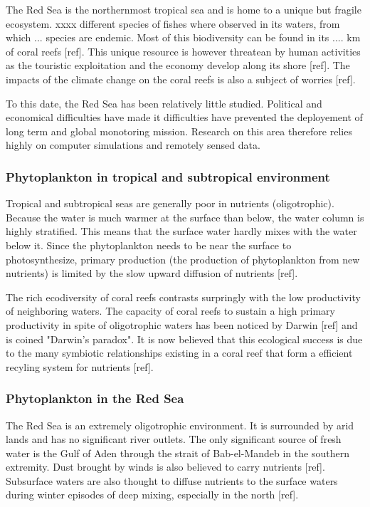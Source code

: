 			The Red Sea is the northernmost tropical sea and is home to a unique but fragile ecosystem. xxxx different species of fishes where observed in its waters, from which ... species are endemic. Most of this biodiversity can be found in its .... km  of coral reefs [ref]. This unique resource is however threatean by human activities as the touristic exploitation and the economy develop along its shore [ref]. The impacts of the climate change on the coral reefs is also a subject of worries [ref]. 

			To this date, the Red Sea has been relatively little studied. Political and economical difficulties have made it difficulties have prevented the deployement of long term and global monotoring mission. Research on this area therefore relies highly on computer simulations and remotely sensed data.

		\subsubsection{Phytoplankton in tropical and subtropical environment}

			Tropical and subtropical seas are generally poor in nutrients (oligotrophic). Because the water is much warmer at the surface than below, the water column is highly stratified. This means that the surface water hardly mixes with the water below it. Since the phytoplankton needs to be near the surface to photosynthesize, primary production (the production of phytoplankton from new nutrients) is limited by the slow upward diffusion of nutrients [ref].

			The rich ecodiversity of coral reefs contrasts surpringly with the low productivity of neighboring waters. The capacity of coral reefs to sustain a high primary productivity in spite of oligotrophic waters has been noticed by Darwin [ref] and is coined "Darwin's paradox". It is now believed that this ecological success is due to the many symbiotic relationships existing in a coral reef that form a efficient recyling system for nutrients [ref]. 

		\subsubsection{Phytoplankton in the Red Sea}

			The Red Sea is an extremely oligotrophic environment. It is surrounded by arid lands and has no significant river outlets. The only significant source of fresh water is the Gulf of Aden through the strait of Bab-el-Mandeb in the southern extremity. Dust brought by winds is also believed to carry nutrients [ref]. Subsurface waters are also thought to diffuse nutrients to the surface waters during winter episodes of deep mixing, especially in the north [ref].

